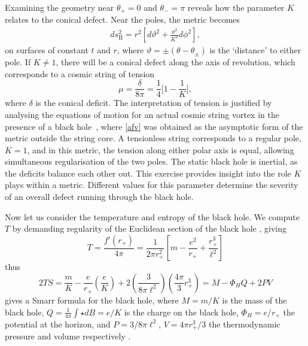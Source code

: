 \documentclass[
twoside,openright,frontopenright]{dmathesis}
\begin{document}
Examining the geometry near $\theta_+ = 0$ and $\theta_- = \pi$ reveals how the
parameter $K$ relates to the conical defect. Near the poles, the metric becomes
\begin{align}
ds_{\mathrm{II}}^2 = r^2 \left[ d\vartheta^2 + \frac{\vartheta^2}{K^2} d\phi^2\right],
\end{align}
on surfaces of constant $t$ and $r$, where
$\vartheta = \pm (\theta - \theta_\pm)$ is the `distance' to either pole. If
$K\neq 1$, there will be a conical defect along the axis of revolution, which
corresponds to a cosmic string of tension
\begin{equation}
\mu = \frac{\delta}{8\pi} = \frac14 \bigg[1-\frac{1}{K}\bigg],
\label{afvtension}
\end{equation}
where $\delta$ is the conical deficit. The interpretation of tension is
justified by analysing the equations of motion for an actual cosmic string
vortex in the presence of a black hole~\cite{Achucarro:1995nu}, where
\eqref{afv} was obtained as the asymptotic form of the metric outside the string
core.  A tensionless string corresponds to a regular pole, $K=1$, and in this
metric, the tension along either polar axis is equal, allowing simultaneous
regularisation of the two poles. The static black hole is inertial, as the
deficits balance each other out. This exercise provides insight into the role
$K$ plays within a metric. Different values for this parameter determine the
severity of an overall defect running through the black hole.

Now let us consider the temperature and entropy of the black hole. We compute
$T$ by demanding regularity of the Euclidean section of the black hole
\cite{Gibbons:1976ue}, giving
\begin{equation}
T = \frac{f'(r_+)}{4\pi} = \frac{1}{2\pi r_+^2} \left [
m - \frac{e^2}{r_+} + \frac{r_+^3}{\ell^2}\right]
\end{equation}
thus 
\begin{equation}
2TS = \frac{m}{K} - \frac{e}{r_+}\left (\frac{e}{K} \right ) 
+ 2\left (\frac{3}{8\pi \ell^2} \right ) \left (\frac{4\pi}{3} r_+^3\right ) 
= M - \Phi_H Q + 2PV
\end{equation}
gives a Smarr formula \cite{Smarr:1972kt} for the black hole, where $M=m/K$ is
the mass of the black hole, $Q = \frac{1}{4\pi}
\int \star dB=e/K$ is the charge on the black hole, 
$\Phi_H = e/r_+$ the potential at the horizon, and $P = 3/8\pi \ell^2$, 
$V = 4\pi r_+^3/3$ the thermodynamic pressure and volume respectively 
\cite{Teitelboim:1985dp,Kastor:2009wy,Dolan:2010ha,Cvetic:2010jb,
Dolan:2011xt,Kubiznak:2012wp,Kubiznak:2016qmn}.
\end{document}
